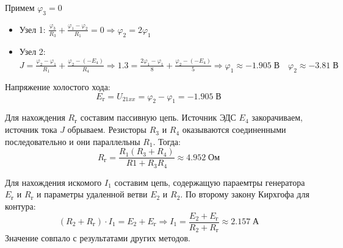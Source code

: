 \documentclass[12pt,fleqn]{article}
\begin{document}
\begin{justify}
    Примем $\varphi_3 = 0$
    \begin{itemize}
        \item Узел 1: $ \frac{\varphi_3}{R_3} + \frac{\varphi_1 - \varphi_2}{R_1} = 0 \Rightarrow \varphi_2 = 2\varphi_1 $
        \item Узел 2: $ J = \frac{\varphi_2 - \varphi_1}{R_1} + \frac{\varphi_2 - (-E_4)}{R_4} \Rightarrow 1.3 = \frac{2\varphi_1 - \varphi_1}{8} + \frac{\varphi_2 - (-E_4)}{5} \Rightarrow \varphi_1 \approx -1.905 \; \text{В} \quad \varphi_2 \approx -3.81 \; \text{В} $
    \end{itemize}

    Напряжение холостого хода:
    \[ E_\text{г} = U_{21xx} = \varphi_2 - \varphi_1 = -1.905 \; \text{В} \]

    Для нахождения $R_\text{г}$ составим пассивную цепь. Источник ЭДС $E_4$ закорачиваем, источник тока $J$ обрываем.
    Резисторы $R_3$ и $R_4$ оказываются соединенными последовательно и они параллельны $R_1$. Тогда:
    \[ R_\text{г} = \frac{R_1(R_3 + R_4)}{R1 + R_3R_4} \approx 4.952 \; \text{Ом} \]

    Для нахождения искомого $I_1$ составим цепь, содержащую параемтры генератора $E_\text{г}$ и $R_\text{г}$ и параметры удаленной ветви $E_2$ и $R_2$.
    По второму закону Кирхгофа для контура: 
    \[ (R_2 + R_\text{г}) \cdot I_1 = E_2 + E_\text{{г}} \Rightarrow I_1 = \frac{E_2 + E_\text{г}}{R_2 + R_\text{г}} \approx 2.157 \; \text{А} \]
    Значение совпало с результатами других методов.

\end{justify}
\end{document}
